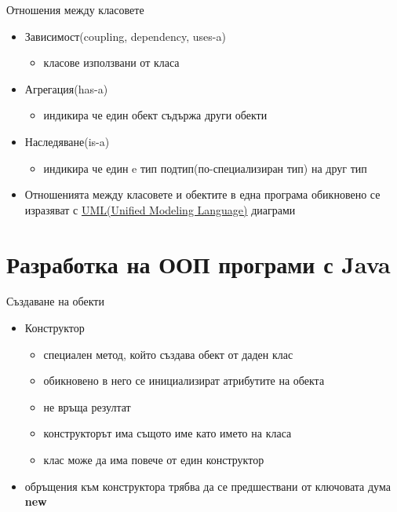 \documentclass{beamer}
\begin{document}
\begin{frame}{Отношения между класовете}
  \transdissolve
  \begin{itemize}
  \item Зависимост(coupling, dependency, uses-a) \pause
    \begin{itemize}
    \item класове използвани от класа \pause
    \end{itemize}
  \item Агрегация(has-a) \pause
    \begin{itemize}
    \item индикира че един обект съдържа други обекти \pause
    \end{itemize}
  \item Наследяване(is-a) \pause
    \begin{itemize}
    \item индикира че един e тип подтип(по-специализиран тип) на друг тип
    \end{itemize}
  \item Отношенията между класовете и обектите в една програма
    обикновено се изразяват с \href{http://en.wikipedia.org/wiki/Unified_Modeling_Language}{UML(Unified Modeling Language)} диаграми
  \end{itemize}
\end{frame}

\section{Разработка на ООП програми с Java}
\begin{frame}{Създаване на обекти}
  \transdissolve
  \begin{itemize}
  \item Конструктор \pause
    \begin{itemize}
    \item специален метод, който създава обект от даден клас \pause
    \item обикновено в него се инициализират атрибутите на обекта
      \pause
    \item не връща резултат \pause
    \item конструкторът има същото име като името на класа \pause
    \item клас може да има повече от един
      конструктор \pause
    \end{itemize}
  \item обръщения към конструктора трябва да се предшествани от
    ключовата дума
    \textbf{new}
  \end{itemize}
\end{frame}
\end{document}
